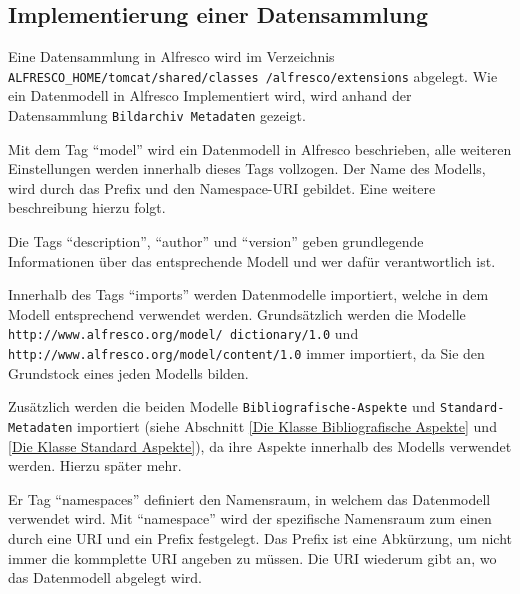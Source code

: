 \FloatBarrier
\subsection{Implementierung einer Datensammlung}
Eine Datensammlung in Alfresco wird im Verzeichnis \texttt{ALFRESCO\_HOME/tomcat/shared/classes
/alfresco/extensions} abgelegt.
Wie ein Datenmodell in Alfresco Implementiert wird, wird anhand der Datensammlung \texttt{Bildarchiv Metadaten} gezeigt.

Mit dem Tag "`model"' wird ein Datenmodell in Alfresco beschrieben, alle weiteren Einstellungen werden innerhalb dieses Tags vollzogen. Der Name des Modells, wird durch das Prefix und den Namespace-URI gebildet. Eine weitere beschreibung hierzu folgt.

Die Tags "`description"', "`author"' und "`version"' geben grundlegende Informationen \"uber das entsprechende Modell und wer daf\"ur verantwortlich ist.

Innerhalb des Tags "`imports"' werden Datenmodelle importiert, welche in dem Modell entsprechend verwendet werden. Grunds\"atzlich werden die Modelle \texttt{http://www.alfresco.org/model/ dictionary/1.0} und \texttt{http://www.alfresco.org/model/content/1.0} immer importiert, da Sie den Grundstock eines jeden Modells bilden.

Zus\"atzlich werden die beiden Modelle \texttt{Bibliografische-Aspekte} und \texttt{Standard-Metadaten} importiert (siehe Abschnitt \ref{Die Klasse Bibliografische Aspekte} und \ref{Die Klasse Standard Aspekte}), da ihre Aspekte innerhalb des Modells verwendet werden. Hierzu sp\"ater mehr.

Er Tag "`namespaces"' definiert den Namensraum, in welchem das Datenmodell verwendet wird. Mit "`namespace"' wird der spezifische Namensraum zum einen durch eine URI und ein Prefix festgelegt. Das Prefix ist eine Abk\"urzung, um nicht immer die kommplette URI angeben zu m\"ussen. Die URI wiederum gibt an, wo das Datenmodell abgelegt wird.

